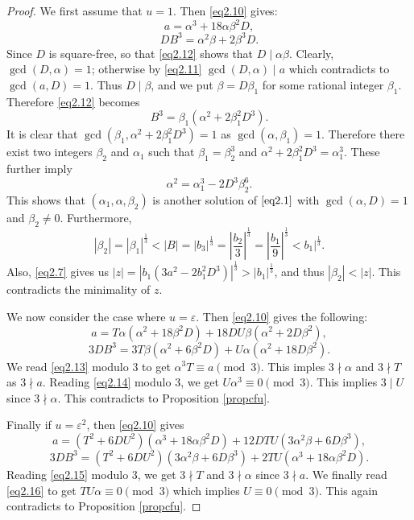 \documentclass[12pt, 14paper,reqno]{amsart}
\theoremstyle{plain}
\theoremstyle{proof}
\numberwithin{equation}{section}
\begin{document}
\begin{proof}
We first assume that $u=1$. Then \eqref{eq2.10} gives:
\begin{equation}\label{eq2.11}
a=\alpha^3+18\alpha\beta^2D,
\end{equation} 
\begin{equation}\label{eq2.12}
DB^3=\alpha^2\beta+2\beta^3 D.
\end{equation}
Since $D$ is square-free, so that \eqref{eq2.12} shows that $D\mid \alpha\beta$. Clearly, $\gcd(D,\alpha)=1$; otherwise by \eqref{eq2.11} $\gcd(D,\alpha)\mid a$ which contradicts to $\gcd(a,D)=1$. Thus $D\mid \beta$, and we put $\beta=D\beta_1$ for some rational integer $\beta_1$. Therefore \eqref{eq2.12} becomes 
$$B^3=\beta_1(\alpha^2+2\beta_1^2D^3).$$
It is clear that $\gcd(\beta_1, \alpha^2+2\beta_1^2D^3)=1$ as $\gcd(\alpha, \beta_1)=1$. Therefore there exist two integers $\beta_2$ and $\alpha_1$ such that $\beta_1=\beta_2^3$ and $\alpha^2+2\beta_1^2D^3=\alpha_1^3$. These further imply 
$$\alpha^2=\alpha_1^3-2D^3\beta_2^6.$$
This shows that $(\alpha_1, \alpha, \beta_2)$ is another solution of $\eqref{eq2.1}$ with $\gcd(\alpha,D)=1$ and $\beta_2\ne 0$. Furthermore, 
$$|\beta_2|=|\beta_1|^{\frac{1}{3}}<|B|=|b_3|^{\frac{1}{3}}=|\frac{b_2}{3}|^{\frac{1}{3}}=|\frac{b_1}{9}|^{\frac{1}{3}}<b_1|^{\frac{1}{3}}.$$
Also, \eqref{eq2.7} gives us  
$|z|=|b_1(3a^2-2b_1^2D^3)|^{\frac{1}{3}}>|b_1|^{\frac{1}{3}}$, and thus $|\beta_2|<|z|$. This contradicts the minimality of $z$. 

We now consider the case where $u=\varepsilon$. Then \eqref{eq2.10} gives the following:
\begin{equation}\label{eq2.13}
a=T\alpha(\alpha^2+18\beta^2D)+18DU\beta(\alpha^2+2D\beta^2),
\end{equation} 
\begin{equation}\label{eq2.14}
3DB^3=3T\beta(\alpha^2+6\beta^2D)+U\alpha(\alpha^2+18D\beta^2).
\end{equation}
We read \eqref{eq2.13} modulo $3$ to get $\alpha^3T\equiv a\pmod 3$. This imples $3\nmid\alpha$  and $3\nmid T$ as $3\nmid a$. Reading \eqref{eq2.14} modulo $3$, we get 
$U\alpha^3\equiv 0\pmod 3$. This implies $3\mid U$ since $3\nmid \alpha$. This contradicts to Proposition \ref{propcfu}.

Finally if $u=\varepsilon^2$, then \eqref{eq2.10} gives 
\begin{equation}\label{eq2.15}
a=(T^2+6DU^2)(\alpha^3+18\alpha\beta^2D)+12DTU(3\alpha^2\beta+6D\beta^3),
\end{equation}
\begin{equation}\label{eq2.16}
3DB^3=(T^2+6DU^2)(3\alpha^2\beta+6D\beta^3)+2TU(\alpha^3+18\alpha\beta^2D).
\end{equation}
Reading \eqref{eq2.15} modulo $3$, we get $3\nmid T$ and $3\nmid \alpha$ since $3\nmid a$. We finally read \eqref{eq2.16} to get $TU\alpha\equiv 0\pmod 3$ which implies $U\equiv 0\pmod 3$. This again contradicts to Proposition \ref{propcfu}. 
\end{proof}
\end{document}
